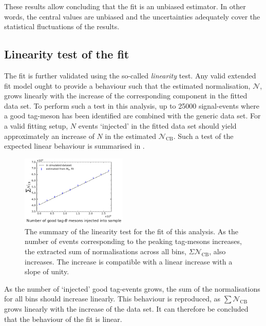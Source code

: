 These results allow concluding that the \Mbc fit is an unbiased estimator.
In other words, the central values are unbiased and the uncertainties adequately cover the statistical fluctuations of the results.

\subsection{Linearity test of the \texorpdfstring{\Mbc}{Mbc} fit}\label{sec:linearity_test}

The fit is further validated using the so-called \textit{linearity} test.
Any valid extended fit model ought to provide a behaviour such that the estimated normalisation, $\mathcal{N}$, grows linearly with the increase of the corresponding component in the fitted data set.
To perform such a test in this analysis, up to 25000 \BtoXsgamma signal-\MC events where a good tag-\B meson has been identified are combined with the generic \MC data set.
For a valid fitting setup, $N$ events `injected' in the fitted data set should yield approximately an increase of $N$ in the estimated $\mathcal{N}_{\mathrm{CB}}$.
Such a test of the expected linear behaviour is summarised in .

\begin{figure}[htbp!]
    \centering
    \includegraphics[width=0.45\textwidth]{figures/mc_validation/linearity_check_longer.pdf}
    \caption{\label{fig:linearity_test}The summary of the linearity test for the \Mbc fit of this analysis.
    As the number of events corresponding to the peaking tag-\B mesons increases, the extracted sum of normalisations across all bins, $\Sigma\mathcal{N}_{\mathrm{CB}}$, also increases.
    The increase is compatible with a linear increase with a slope of unity.
    }
\end{figure}

As the number of `injected' good tag-\B events grows, the sum of the normalisations for all \EB bins should increase linearly.
This behaviour is reproduced, as $\sum \mathcal{N}_{\mathrm{CB}}$ grows linearly with the increase of the data set.
It can therefore be concluded that the behaviour of the \Mbc fit is linear.

